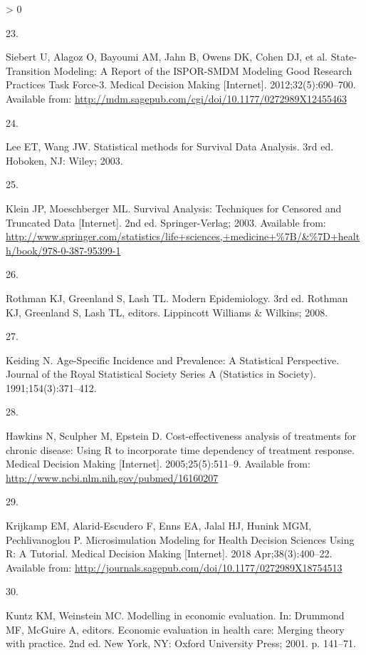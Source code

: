 \documentclass[
]{article}
\newlength{\cslhangindent}
\newlength{\csllabelwidth}
\newenvironment{CSLReferences}[2] %
 {%
  \setlength{\parindent}{0pt}
  \ifodd #1 \everypar{\setlength{\hangindent}{\cslhangindent}}\ignorespaces\fi
  \ifnum #2 > 0
  \setlength{\parskip}{#2\baselineskip}
  \fi
 }%
 {}
\newcommand{\CSLLeftMargin}[1]{\parbox[t]{\csllabelwidth}{#1}}
\newcommand{\CSLRightInline}[1]{\parbox[t]{\linewidth - \csllabelwidth}{#1}\break}
\begin{document}
\begin{CSLReferences}{0}{0}
\leavevmode\hypertarget{ref-Siebert2012c}{}%
\CSLLeftMargin{23. }
\CSLRightInline{Siebert U, Alagoz O, Bayoumi AM, Jahn B, Owens DK, Cohen DJ, et al. {State-Transition Modeling: A Report of the ISPOR-SMDM Modeling Good Research Practices Task Force-3}. Medical Decision Making {[}Internet{]}. 2012;32(5):690--700. Available from: \url{http://mdm.sagepub.com/cgi/doi/10.1177/0272989X12455463}}

\leavevmode\hypertarget{ref-Lee2003a}{}%
\CSLLeftMargin{24. }
\CSLRightInline{Lee ET, Wang JW. {Statistical methods for Survival Data Analysis}. 3rd ed. Hoboken, NJ: Wiley; 2003. }

\leavevmode\hypertarget{ref-Klein2003}{}%
\CSLLeftMargin{25. }
\CSLRightInline{Klein JP, Moeschberger ML. {Survival Analysis: Techniques for Censored and Truncated Data} {[}Internet{]}. 2nd ed. Springer-Verlag; 2003. Available from: \url{http://www.springer.com/statistics/life+sciences,+medicine+\%7B/\&\%7D+health/book/978-0-387-95399-1}}

\leavevmode\hypertarget{ref-Rothman2008h}{}%
\CSLLeftMargin{26. }
\CSLRightInline{Rothman KJ, Greenland S, Lash TL. {Modern Epidemiology}. 3rd ed. Rothman KJ, Greenland S, Lash TL, editors. Lippincott Williams {\&} Wilkins; 2008. }

\leavevmode\hypertarget{ref-Keiding1991}{}%
\CSLLeftMargin{27. }
\CSLRightInline{Keiding N. {Age-Specific Incidence and Prevalence: A Statistical Perspective}. Journal of the Royal Statistical Society Series A (Statistics in Society). 1991;154(3):371--412. }

\leavevmode\hypertarget{ref-Hawkins2005}{}%
\CSLLeftMargin{28. }
\CSLRightInline{Hawkins N, Sculpher M, Epstein D. {Cost-effectiveness analysis of treatments for chronic disease: Using R to incorporate time dependency of treatment response.} Medical Decision Making {[}Internet{]}. 2005;25(5):511--9. Available from: \url{http://www.ncbi.nlm.nih.gov/pubmed/16160207}}

\leavevmode\hypertarget{ref-Krijkamp2018}{}%
\CSLLeftMargin{29. }
\CSLRightInline{Krijkamp EM, Alarid-Escudero F, Enns EA, Jalal HJ, Hunink MGM, Pechlivanoglou P. {Microsimulation Modeling for Health Decision Sciences Using R: A Tutorial}. Medical Decision Making {[}Internet{]}. 2018 Apr;38(3):400--22. Available from: \url{http://journals.sagepub.com/doi/10.1177/0272989X18754513}}

\leavevmode\hypertarget{ref-Kuntz2001}{}%
\CSLLeftMargin{30. }
\CSLRightInline{Kuntz KM, Weinstein MC. {Modelling in economic evaluation}. In: Drummond MF, McGuire A, editors. Economic evaluation in health care: Merging theory with practice. 2nd ed. New York, NY: Oxford University Press; 2001. p. 141--71. }


\end{CSLReferences}
\end{document}
